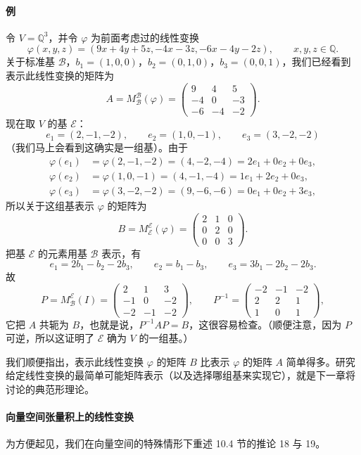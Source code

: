 \paragraph{例}
令 $V=\mathbb Q^3$，并令 $\varphi$ 为前面考虑过的线性变换
\[
\varphi(x,y,z)=(9x+4y+5z,-4x-3z,-6x-4y-2z),
\qquad x,y,z\in\mathbb Q.
\]
关于标准基 $\mathcal B$，$b_1=(1,0,0)$，$b_2=(0,1,0)$，$b_3=(0,0,1)$，我们已经看到表示此线性变换的矩阵为
\[
A=M_{\mathcal B}^{\mathcal B}(\varphi)=
\begin{pmatrix}
9&4&5\\
-4&0&-3\\
-6&-4&-2
\end{pmatrix}.
\]
现在取 $V$ 的基 $\mathcal E$：
\[
e_1=(2,-1,-2),\qquad e_2=(1,0,-1),\qquad e_3=(3,-2,-2)
\]
（我们马上会看到这确实是一组基）。由于
\[
\begin{aligned}
\varphi(e_1)&=\varphi(2,-1,-2)=(4,-2,-4)=2e_1+0e_2+0e_3,\\
\varphi(e_2)&=\varphi(1,0,-1)=(4,-1,-4)=1e_1+2e_2+0e_3,\\
\varphi(e_3)&=\varphi(3,-2,-2)=(9,-6,-6)=0e_1+0e_2+3e_3,
\end{aligned}
\]
所以关于这组基表示 $\varphi$ 的矩阵为
\[
B=M_{\mathcal E}^{\mathcal E}(\varphi)=
\begin{pmatrix}
2&1&0\\
0&2&0\\
0&0&3
\end{pmatrix}.
\]
把基 $\mathcal E$ 的元素用基 $\mathcal B$ 表示，有
\[
e_1=2b_1-b_2-2b_3,
\qquad e_2=b_1-b_3,
\qquad e_3=3b_1-2b_2-2b_3.
\]
故
\[
P=M_{\mathcal B}^{\mathcal E}(I)=
\begin{pmatrix}
2&1&3\\
-1&0&-2\\
-2&-1&-2
\end{pmatrix},
\qquad
P^{-1}=\begin{pmatrix}
-2&-1&-2\\
2&2&1\\
1&0&1
\end{pmatrix},
\]
它把 $A$ 共轭为 $B$，也就是说，$P^{-1}AP=B$，这很容易检查。（顺便注意，因为 $P$ 可逆，所以这证明了 $\mathcal E$ 确为 $V$ 的一组基。）

我们顺便指出，表示此线性变换 $\varphi$ 的矩阵 $B$ 比表示 $\varphi$ 的矩阵 $A$ 简单得多。研究给定线性变换的最简单可能矩阵表示（以及选择哪组基来实现它），就是下一章将讨论的典范形理论。

\paragraph{向量空间张量积上的线性变换}
为方便起见，我们在向量空间的特殊情形下重述 10.4 节的推论 18 与 19。

